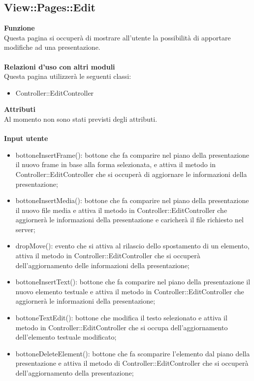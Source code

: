 {\subsection{View::Pages::Edit}{
	\textbf{Funzione}\\
	\indent Questa pagina si occuperà di mostrare all'utente la possibilità di apportare modifiche ad una presentazione.\\\\
	\textbf{Relazioni d'uso con altri moduli}\\
	\indent Questa pagina utilizzerà le seguenti classi:
	\begin{itemize}
		\item Controller::EditController
	\end{itemize}
	\textbf{Attributi}\\
	\indent Al momento non sono stati previsti degli attributi.\\\\
	\textbf{Input utente}
	\begin{itemize}
		\item bottoneInsertFrame(): bottone che fa comparire nel piano della presentazione il nuovo frame in base alla forma selezionata, e attiva il metodo in Controller::EditController che si occuperà di aggiornare le informazioni della presentazione;
		\item bottoneInsertMedia(): bottone che fa comparire nel piano della presentazione il nuovo file media e attiva il metodo in Controller::EditController che aggiornerà le informazioni della presentazione e caricherà il file richiesto nel server;
		\item dropMove(): evento che si attiva al rilascio dello spostamento di un elemento, attiva il metodo in Controller::EditController che si occuperà dell'aggiornamento delle informazioni della presentazione;
		\item bottoneInsertText(): bottone che fa comparire nel piano della presentazione il nuovo elemento testuale e attiva il metodo in Controller::EditController che aggiornerà le informazioni della presentazione;
		\item bottoneTextEdit(): bottone che modifica il testo selezionato e attiva il metodo in Controller::EditController che si occupa dell'aggiornamento dell'elemento testuale modificato; 
		\item bottoneDeleteElement(): bottone che fa scomparire l'elemento dal piano della presentazione e attiva il metodo di Controller::EditController che si occuperà dell'aggiornamento della presentazione;

\end{itemize}}}
